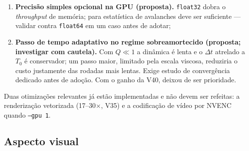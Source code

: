 \documentclass[11pt,a4paper]{article}
\newcommand{\code}[1]{\texttt{#1}}
\begin{document}
\begin{enumerate}
\emph{Validação}: execução paralela com 4 \emph{workers} produz CSVs
bit-idênticos aos da execução serial; retomada total (``nada a fazer'')
e parcial (interrupção simulada) funcionam; o script de análise lê o
\emph{manifest} da V02 sem alteração. O ganho de tempo é $\sim$linear no
número de núcleos --- não mensurável no ambiente de desenvolvimento
(1 núcleo), a confirmar no servidor;
\item \textbf{Precisão simples opcional na GPU (proposta).}
\code{float32} dobra o \emph{throughput} de memória; para estatística de
avalanches deve ser suficiente --- validar contra \code{float64} em um
caso antes de adotar;
\item \textbf{Passo de tempo adaptativo no regime sobreamortecido
(proposta; investigar com cautela).} Com $Q \ll 1$ a dinâmica é lenta e
o $\Delta t$ atrelado a $T_0$ é conservador; um passo maior, limitado
pela escala viscosa, reduziria o custo justamente das rodadas mais
lentas. Exige estudo de convergência dedicado antes de adoção. Com o
ganho da V40, deixou de ser prioridade.
\end{enumerate}

Duas otimizações relevantes já estão implementadas e não devem ser
refeitas: a renderização vetorizada (17--30$\times$, V35) e a
codificação de vídeo por NVENC quando \code{--gpu 1}.

\subsection{Aspecto visual}
\end{document}
